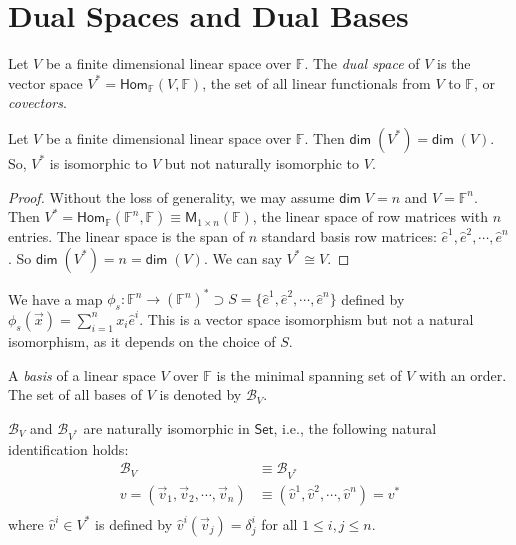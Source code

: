 \documentclass[
	11pt, %
	fleqn, %
	a4paper, %
]{LegrandOrangeBook}
\newcommand{\Hom}{\mathsf{Hom}} %
\newcommand{\F}{\mathbb{F}} %
\newcommand{\M}[2]{\mathsf{M}_{#1}(#2)} %
\newcommand{\Set}{\boldsymbol{\mathsf{Set}}} %
\newcommand{\B}{\mathcal{B}} %
\renewcommand{\dim}{\mathsf{dim\;}} %
\begin{document}
\newpage

\section{Dual Spaces and Dual Bases}

Let $V$ be a finite dimensional linear space over $\F$. The \emph{dual space} of $V$ is the vector space $V^* = \Hom_{\F}(V, \F)$, the set of all linear functionals from $V$ to $\F$, or \emph{covectors}. 

\begin{proposition}
    Let $V$ be a finite dimensional linear space over $\F$. Then $\dim(V^*) = \dim(V)$. So, $V^*$ is isomorphic to $V$ but not naturally isomorphic to $V$.
\end{proposition}
\begin{proof}
    Without the loss of generality, we may assume $\dim{V} = n$ and $V = \F^n$. Then $V^* = \Hom_{\F}(\F^n, \F) \equiv \M{1 \times n}{\F}$, the linear space of row matrices with $n$ entries. The linear space is the span of $n$ standard basis row matrices: $\hat{e}^1, \hat{e}^2, \cdots, \hat{e}^n$. So $\dim(V^*) = n = \dim(V)$. We can say $V^* \cong V$.
\end{proof}

We have a map $\phi_s : \F^n \to (\F^n)^* \supset S = \{\hat{e}^1, \hat{e}^2, \cdots, \hat{e}^n\}$ defined by $\phi_s(\vec{x}) = \sum_{i=1}^n x_i \hat{e}^i$. This is a vector space isomorphism but not a natural isomorphism, as it depends on the choice of $S$.

\begin{definition}[Bases]
    A \emph{basis} of a linear space $V$ over $\F$ is the minimal spanning set of $V$ with an order. The set of all bases of $V$ is denoted by $\B_V$.
\end{definition}

\begin{proposition}
    $\B_V$ and $\B_{V^*}$ are naturally isomorphic in $\Set$, i.e., the following natural identification holds:
    \[
        \begin{split}
            \B_V &\equiv \B_{V^*} \\
            v = (\vec{v}_1, \vec{v}_2, \cdots, \vec{v}_n) &\equiv (\hat{v}^1, \hat{v}^2, \cdots, \hat{v}^n) = v^* \\
        \end{split}
    \]
    where $\hat{v}^i \in V^*$ is defined by $\hat{v}^i(\vec{v}_j) = \delta^i_j$ for all $1 \leq i, j \leq n$.
\end{proposition}
\end{document}
